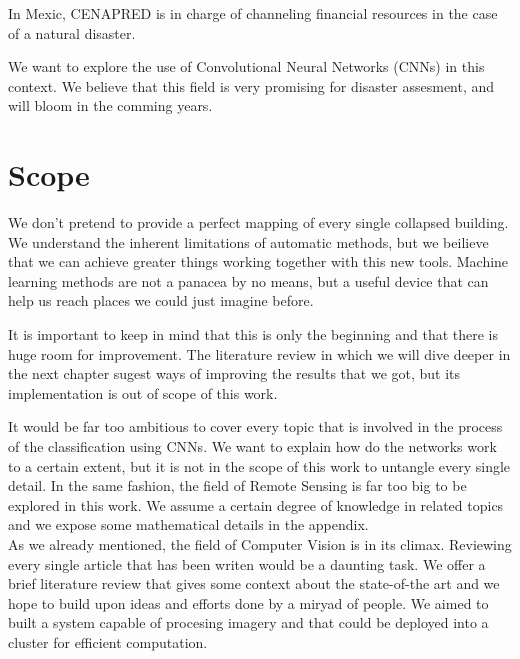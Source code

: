 In Mexic, CENAPRED is in charge of channeling financial resources in the case of a natural disaster. 

We want to explore the use of Convolutional Neural Networks (CNNs) in this context. We believe that this field is very promising for disaster assesment, and will bloom in the comming years. 

\section{Scope}

We don't pretend to provide a perfect mapping of every single collapsed building. We understand the inherent limitations of automatic methods, but we beilieve that we can achieve greater things working together with this new tools. Machine learning methods are not a panacea by no means, but a useful device that can help us reach places we could just imagine before.

It is important to keep in mind that this is only the beginning and that there is huge room for improvement. The literature review in which we will dive deeper in the next chapter sugest ways of improving the results that we got, but its implementation is out of scope of this work.

It would be far too ambitious to cover every topic that is involved in the process of the classification using CNNs. We want to explain how do the networks work to a certain extent, but it is not in the scope of this work to untangle every single detail. In the same fashion, the field of Remote Sensing is far too big to be explored in this work. We assume a certain degree of knowledge in related topics and we expose some mathematical details in the appendix.\\

As we already mentioned, the field of Computer Vision is in its climax. Reviewing every single article that has been writen would be a daunting task. We offer a brief literature review that gives some context about the state-of-the art and we hope to build upon ideas and efforts done by a miryad of people. We aimed to built a system capable of procesing imagery and that could be deployed into a cluster for efficient computation.\\
